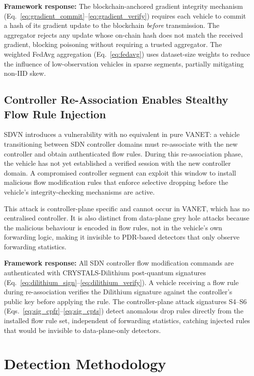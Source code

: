 \documentclass[12pt, a4paper]{report}
\newcommand{\mypar}{\vspace{0.8em}\noindent}
\begin{document}
\mypar
\textbf{Framework response:} The blockchain-anchored gradient integrity
mechanism (Eq.~\eqref{eq:gradient_commit}--\eqref{eq:gradient_verify}) requires
each vehicle to commit a hash of its gradient update to the blockchain
\emph{before} transmission. The aggregator rejects any update whose on-chain
hash does not match the received gradient, blocking poisoning without requiring a
trusted aggregator. The weighted FedAvg aggregation (Eq.~\eqref{eq:fedavg})
uses dataset-size weights to reduce the influence of low-observation vehicles in
sparse segments, partially mitigating non-IID skew.

\subsection{Controller Re-Association Enables Stealthy Flow Rule Injection}

SDVN introduces a vulnerability with no equivalent in pure VANET: a vehicle
transitioning between SDN controller domains must re-associate with the new
controller and obtain authenticated flow rules. During this re-association phase,
the vehicle has not yet established a verified session with the new controller
domain. A compromised controller segment can exploit this window to install
malicious flow modification rules that enforce selective dropping before the
vehicle's integrity-checking mechanisms are active.

This attack is controller-plane specific and cannot occur in VANET, which has no
centralised controller. It is also distinct from data-plane grey hole attacks
because the malicious behaviour is encoded in flow rules, not in the vehicle's own
forwarding logic, making it invisible to PDR-based detectors that only observe
forwarding statistics.

\mypar
\textbf{Framework response:} All SDN controller flow modification commands are
authenticated with CRYSTALS-Dilithium post-quantum signatures
(Eq.~\eqref{eq:dilithium_sign}--\eqref{eq:dilithium_verify}). A vehicle receiving
a flow rule during re-association verifies the Dilithium signature against the
controller's public key before applying the rule. The controller-plane attack
signatures S4--S6 (Eqs.~\eqref{eq:sig_cpfr}--\eqref{eq:sig_cpts}) detect
anomalous drop rules directly from the installed flow rule set, independent of
forwarding statistics, catching injected rules that would be invisible to
data-plane-only detectors.

\section{Detection Methodology}
\label{sec:detection_methodology}
\end{document}
